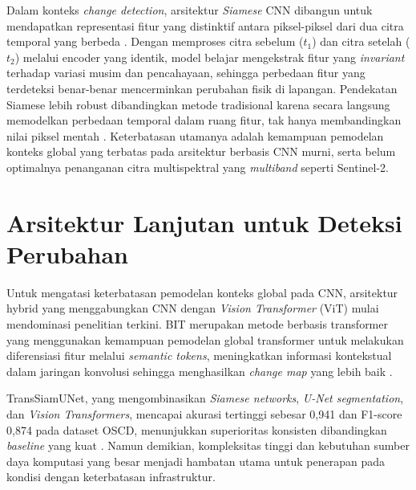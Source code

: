 Dalam konteks \textit{change detection}, arsitektur \textit{Siamese} CNN dibangun untuk mendapatkan representasi fitur yang distinktif antara piksel-piksel dari dua citra temporal yang berbeda \citep{PENG2025104282}. Dengan memproses citra sebelum ($t_1$) dan citra setelah ($t_2$) melalui encoder yang identik, model belajar mengekstrak fitur yang \textit{invariant} terhadap variasi musim dan pencahayaan, sehingga perbedaan fitur yang terdeteksi benar-benar mencerminkan perubahan fisik di lapangan. Pendekatan Siamese lebih robust dibandingkan metode tradisional karena secara langsung memodelkan perbedaan temporal dalam ruang fitur, tak hanya membandingkan nilai piksel mentah \citep{Lei2026}. Keterbatasan utamanya adalah kemampuan pemodelan konteks global yang terbatas pada arsitektur berbasis CNN murni, serta belum optimalnya penanganan citra multispektral yang \textit{multiband} seperti Sentinel-2.


\section{Arsitektur Lanjutan untuk Deteksi Perubahan}






Untuk mengatasi keterbatasan pemodelan konteks global pada CNN, arsitektur hybrid yang menggabungkan CNN dengan \textit{Vision Transformer} (ViT) mulai mendominasi penelitian terkini. BIT merupakan metode berbasis transformer yang menggunakan kemampuan pemodelan global transformer untuk melakukan diferensiasi fitur melalui \textit{semantic tokens}, meningkatkan informasi kontekstual dalam jaringan konvolusi sehingga menghasilkan \textit{change map} yang lebih baik \citep{DBLP:journals/corr/abs-2103-00208}.

TransSiamUNet, yang mengombinasikan \textit{Siamese networks}, \textit{U-Net segmentation}, dan \textit{Vision Transformers}, mencapai akurasi tertinggi sebesar 0,941 dan F1-score 0,874 pada dataset OSCD, menunjukkan superioritas konsisten dibandingkan \textit{baseline} yang kuat \cite{Ali2026}. Namun demikian, kompleksitas tinggi dan kebutuhan sumber daya komputasi yang besar menjadi hambatan utama untuk penerapan pada kondisi dengan keterbatasan infrastruktur.

